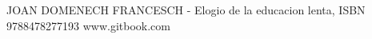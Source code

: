 \begin{thebibliography}{n}
  \cite{Joan}JOAN DOMENECH FRANCESCH - Elogio de la educacion lenta, ISBN 9788478277193
  \cite{gitbook}www.gitbook.com 
\end{thebibliography}